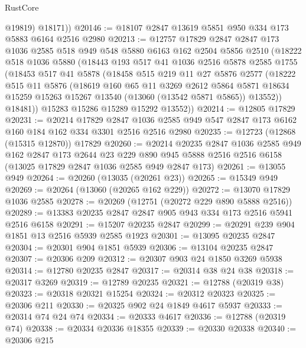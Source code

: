 \begin{lexlean}{RustCore}
\begin{coremodule}
          @19819)
        @18171))
@20146 := @18107 @2847 @13619 @5851 @950 @334 @173 @5883 @6164 @2516 @2980
@20213 := @12757
    @17829
    @2847
    @2847
    @173
    @1036
    @2585
    @518
    @949
    @548
    @5880
    @6163
    @162
    @2504
    @5856
    @2510
    (@18222
      @518
      @1036
      @5880
      (@18443
        @193
        @517
        @41
        @1036
        @2516
        @5878
        @2585
        @1755
        (@18453
          @517
          @41
          @5878
          (@18458
            @515
            @219
            @11
            @27
            @5876
            @2577
            (@18222
              @515
              @11
              @5876
              (@18619
                @160
                @65
                @11
                @3269
                @2612
                @5864
                @5871
                @18634
                @15259
                @15263
                @15267
                @13540
                (@13060 (@13542 @5871 @5865))
                @13552))
            @18481))
        @15283
        @15286
        @15289
        @15292
        @13552))
@20214 := @12805 @17829
@20231 := @20214
    @17829
    @2847
    @1036
    @2585
    @949
    @547
    @2847
    @173
    @6162
    @160
    @184
    @162
    @334
    @3301
    @2516
    @2516
    @2980
@20235 := @12723 (@12868 (@15315 @12870)) @17829
@20260 := @20214
    @20235
    @2847
    @1036
    @2585
    @949
    @162
    @2847
    @173
    @2644
    @23
    @229
    @890
    @945
    @5888
    @2516
    @2516
    @6158
    (@13025 @17829 @2847 @1036 @2585 @949 @2847 @173)
@20261 := @13055 @949
@20264 := @20260 (@13035 (@20261 @23))
@20265 := @15349 @949
@20269 := @20264 (@13060 (@20265 @162 @229))
@20272 := @13070 @17829 @1036 @2585
@20278 := @20269 (@12751 (@20272 @229 @890 @5888 @2516))
@20289 := @13383 @20235 @2847 @2847 @905 @943 @334 @173 @2516 @5941 @2516 @6158
@20291 := @15207 @20235 @2847
@20299 := @20291 @239 @904 @1851 @13 @2516 @5939 @2585 @1923
@20301 := @13095 @20235 @2847
@20304 := @20301 @904 @1851 @5939
@20306 := @13104 @20235 @2847
@20307 := @20306 @209
@20312 := @20307 @903 @24 @1850 @3269 @5938
@20314 := @12780 @20235 @2847
@20317 := @20314 @38 @24 @38
@20318 := @20317 @3269
@20319 := @12789 @20235
@20321 := @12788 (@20319 @38)
@20323 := @20318 @20321 @15254
@20324 := @20312 @20323
@20325 := @20306 @211
@20330 := @20325 @902 @24 @1849 @4617 @5937
@20333 := @20314 @74 @24 @74
@20334 := @20333 @4617
@20336 := @12788 (@20319 @74)
@20338 := @20334 @20336 @18355
@20339 := @20330 @20338
@20340 := @20306 @215

\end{coremodule}
\end{lexlean}
